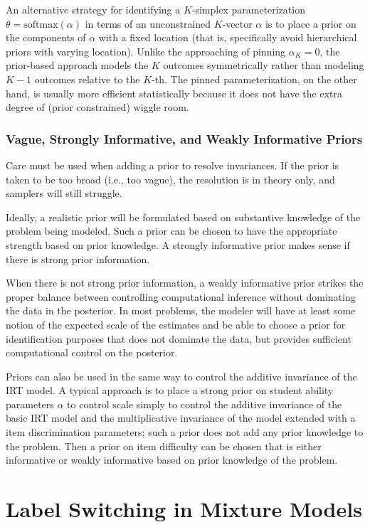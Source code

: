 An alternative strategy for identifying a $K$-simplex parameterization
$\theta = \mbox{softmax}(\alpha)$ in terms of an unconstrained
$K$-vector $\alpha$ is to place a prior on the components of $\alpha$
with a fixed location (that is, specifically avoid hierarchical priors
with varying location).  Unlike the approaching of pinning $\alpha_K =
0$, the prior-based approach models the $K$ outcomes symmetrically
rather than modeling $K-1$ outcomes relative to the $K$-th.  The
pinned parameterization, on the other hand, is usually more efficient
statistically because it does not have the extra degree of (prior
constrained) wiggle room.


\subsubsection{Vague, Strongly Informative, and Weakly Informative Priors}

Care must be used when adding a prior to resolve invariances.  If the
prior is taken to be too broad (i.e., too vague), the resolution is in
theory only, and samplers will still struggle.

Ideally, a realistic prior will be formulated based on substantive
knowledge of the problem being modeled.  Such a prior can be chosen to
have the appropriate strength based on prior knowledge.  A strongly
informative prior makes sense if there is strong prior information.

When there is not strong prior information, a weakly informative prior
strikes the proper balance between controlling computational inference
without dominating the data in the posterior.  In most problems, the
modeler will have at least some notion of the expected scale of the
estimates and be able to choose a prior for identification purposes
that does not dominate the data, but provides sufficient computational
control on the posterior.

Priors can also be used in the same way to control the additive
invariance of the IRT model.  A typical approach is to place a strong
prior on student ability parameters $\alpha$ to control scale simply
to control the additive invariance of the basic IRT model and the
multiplicative invariance of the model extended with a item
discrimination parameters; such a prior does not add any prior
knowledge to the problem.  Then a prior on item difficulty can be
chosen that is either informative or weakly informative based on prior
knowledge of the problem.


\section{Label Switching in Mixture Models}\label{label-switching-problematic.section}

